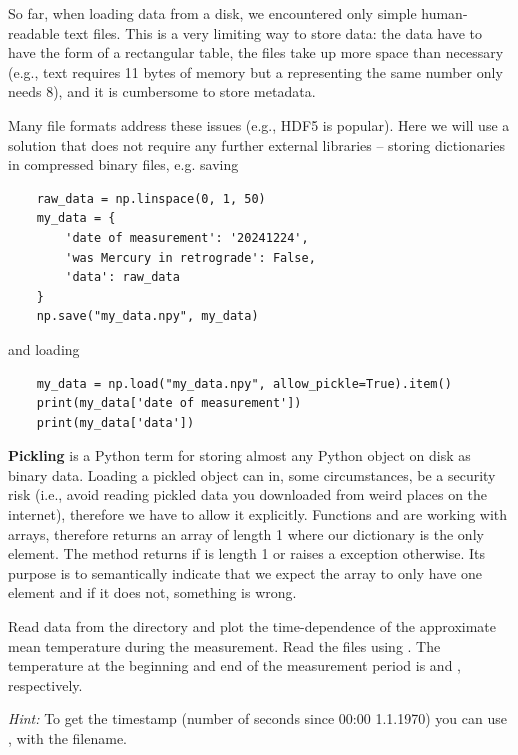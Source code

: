 \begin{syntax}
    \label{syn:npy}
    So far, when loading data from a disk, we encountered only simple human-readable text files. This is a very limiting way to store data: the data have to have the form of a rectangular table, the files take up more space than necessary (e.g., text  requires 11 bytes of memory but a  representing the same number only needs 8), and it is cumbersome to store metadata.

    Many file formats address these issues (e.g., HDF5 is popular). Here we will use a solution that does not require any further external libraries -- storing dictionaries in compressed binary  files, e.g. saving
\begin{lstlisting}
    raw_data = np.linspace(0, 1, 50)
    my_data = {
        'date of measurement': '20241224',
        'was Mercury in retrograde': False,
        'data': raw_data
    }
    np.save("my_data.npy", my_data)
\end{lstlisting}
    and loading
\begin{lstlisting}
    my_data = np.load("my_data.npy", allow_pickle=True).item()
    print(my_data['date of measurement'])
    print(my_data['data'])
\end{lstlisting}

    \textbf{Pickling} is a Python term for storing almost any Python object on disk as binary data. Loading a pickled object can in, some circumstances, be a security risk (i.e., avoid reading pickled data you downloaded from weird places on the internet), therefore we have to allow it explicitly. Functions  and  are working with arrays, therefore  returns an array of length 1 where our dictionary is the only element. The method  returns  if  is length 1 or raises a  exception otherwise. Its purpose is to semantically indicate that we expect the array to only have one element and if it does not, something is wrong.
    
    \begin{exercise}
    Read data from the directory  and plot the time-dependence of the approximate mean temperature during the measurement. Read the files using . The temperature at the beginning and end of the measurement period is  and , respectively.
    
    \emph{Hint:} To get the timestamp (number of seconds since 00:00 1.1.1970) you can use , with  the filename.
\end{exercise}
\end{syntax}

